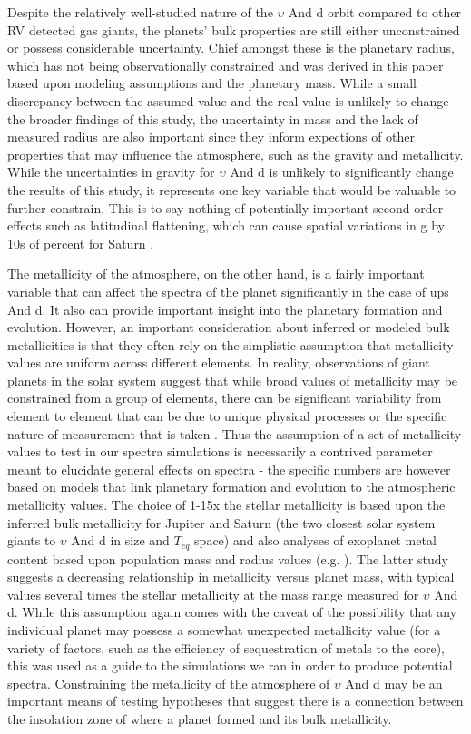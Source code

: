 \documentclass[12pt, letterpaper]{aastex631}
\begin{document}
Despite the relatively well-studied nature of the $\upsilon$ And d orbit compared to other RV detected gas giants, the planets' bulk properties are still either unconstrained or possess considerable uncertainty. Chief amongst these is the planetary radius, which has not being observationally constrained and was derived in this paper based upon modeling assumptions and the planetary mass.  While a small discrepancy between the assumed value and the real value is unlikely to change the broader findings of this study, the uncertainty in mass and the lack of measured radius are also important since they inform expections of other properties that may influence the atmosphere, such as the gravity and metallicity.  While the uncertainties in gravity for $\upsilon$ And d is unlikely to significantly change the results of this study, it represents one key variable that would be valuable to further constrain.  This is to say nothing of potentially important second-order effects such as latitudinal flattening, which can cause spatial variations in g by 10s of percent for Saturn \citep{doi:10.1029/2019JE006354}.

The metallicity of the atmosphere, on the other hand, is a fairly important variable that can affect the spectra of the planet significantly in the case of ups And d.  It also can provide important insight into the planetary formation and evolution.  However, an important consideration about inferred or modeled bulk metallicities is that they often rely on the simplistic assumption that metallicity values are uniform across different elements.  In reality, observations of giant planets in the solar system suggest that while broad values of metallicity may be constrained from a group of elements, there can be significant variability from element to element that can be due to unique physical processes or the specific nature of measurement that is taken \citep{2016arXiv160604510A}.  Thus the assumption of a set of metallicity values to test in our spectra simulations is necessarily a contrived parameter meant to elucidate general effects on spectra - the specific numbers are however based on models that link planetary formation and evolution to the atmospheric metallicity values.  The choice of 1-15x the stellar metallicity is based upon the inferred bulk metallicity for Jupiter and Saturn (the two closest solar system giants to $\upsilon$ And d in size and $T_{eq}$ space) and also analyses of exoplanet metal content based upon population mass and radius values (e.g. \textcite{2016ApJ...831...64T}).   The latter study suggests a decreasing relationship in metallicity versus planet mass, with typical values several times the stellar metallicity at the mass range measured for $\upsilon$ And d.  While this assumption again comes with the caveat of the possibility that any individual planet may possess a somewhat unexpected metallicity value (for a variety of factors, such as the efficiency of sequestration of metals to the core), this was used as a guide to the simulations we ran in order to produce potential spectra.  Constraining the metallicity of the atmosphere of $\upsilon$ And d may be an important means of testing hypotheses that suggest there is a connection between the insolation zone of where a planet formed and its bulk metallicity.
\end{document}
